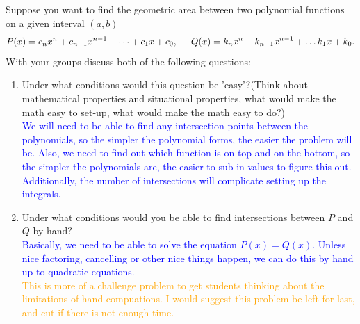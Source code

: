 \documentclass{ximera}
\begin{document}
\begin{exercise}
    Suppose you want to find the geometric area between two polynomial functions on a given interval $(a,b)$
        \begin{align}
        	P(x) = c_{n}x^n + c_{n-1}x^{n-1} + \dots +c_1x+ c_{0}, \hspace{.2in} Q(x) = k_{n}x^n + k_{n-1}x^{n-1} + \dots k_1x+ k_{0}.\nonumber
        \end{align}
With your groups discuss both of the following questions:
        \begin{enumerate}
            \item Under what conditions would this question be 'easy'?(Think about mathematical properties and situational properties, what would make the math easy to set-up, what would make the math easy to do?)\\
            \textcolor{blue}{We will need to be able to find any intersection points between the polynomials, so the simpler the polynomial forms, the easier the problem will be.  Also, we need to find out which function is on top and on the bottom, so the simpler the polynomials are, the easier to sub in values to figure this out.  Additionally, the number of intersections will complicate setting up the integrals. }
            \item Under what conditions would you be able to find intersections between $P$ and $Q$ by hand?\\
            \textcolor{blue}{Basically, we need to be able to solve the equation $P(x)=Q(x)$.  Unless nice factoring, cancelling or other nice things happen, we can do this by hand up to quadratic equations.}\\
            \textcolor{orange}{This is more of a challenge problem to get students thinking about the limitations of hand compuations.  I would suggest this problem be left for last, and cut if there is not enough time. }
        \end{enumerate}
\end{exercise}
\end{document}
